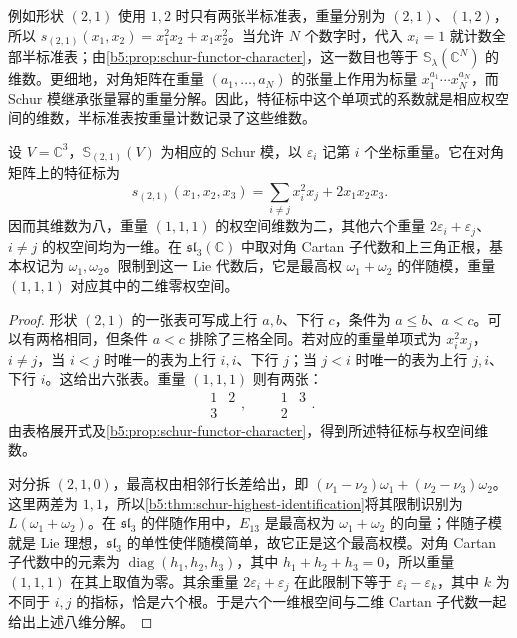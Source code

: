 例如形状 \((2,1)\) 使用 \(1,2\) 时只有两张半标准表，重量分别为 \((2,1)\)、\((1,2)\)，所以 \(s_{(2,1)}(x_1,x_2)=x_1^2x_2+x_1x_2^2\)。当允许 \(N\) 个数字时，代入 \(x_i=1\) 就计数全部半标准表；由\cref{b5:prop:schur-functor-character}，这一数目也等于 \(\mathbb S_\lambda(\mathbb C^N)\) 的维数。更细地，对角矩阵在重量 \((a_1,\ldots,a_N)\) 的张量上作用为标量 \(x_1^{a_1}\cdots x_N^{a_N}\)，而 Schur 模继承张量幂的重量分解。因此，特征标中这个单项式的系数就是相应权空间的维数，半标准表按重量计数记录了这些维数。

\begin{proposition}\label{b5:prop:A-schur-21-weights}
	设 \(V=\mathbb C^3\)，\(\mathbb S_{(2,1)}(V)\) 为相应的 Schur 模，以 \(\varepsilon_i\) 记第 \(i\) 个坐标重量。它在对角矩阵上的特征标为
	\[
		s_{(2,1)}(x_1,x_2,x_3) =\sum_{i\ne j}x_i^2x_j+2x_1x_2x_3.
	\]
	因而其维数为八，重量 \((1,1,1)\) 的权空间维数为二，其他六个重量 \(2\varepsilon_i+\varepsilon_j\)、\(i\ne j\) 的权空间均为一维。在 \(\mathfrak{sl}_3(\mathbb C)\) 中取对角 Cartan 子代数和上三角正根，基本权记为 \(\omega_1,\omega_2\)。限制到这一 Lie 代数后，它是最高权 \(\omega_1+\omega_2\) 的伴随模，重量 \((1,1,1)\) 对应其中的二维零权空间。
\end{proposition}
\begin{proof}
	形状 \((2,1)\) 的一张表可写成上行 \(a,b\)、下行 \(c\)，条件为 \(a\le b\)、\(a<c\)。可以有两格相同，但条件 \(a<c\) 排除了三格全同。若对应的重量单项式为 \(x_i^2x_j\)，\(i\ne j\)，当 \(i<j\) 时唯一的表为上行 \(i,i\)、下行 \(j\)；当 \(j<i\) 时唯一的表为上行 \(j,i\)、下行 \(i\)。这给出六张表。重量 \((1,1,1)\) 则有两张：
	\[
		\begin{array}{cc}1&2\\3&\end{array},
		\qquad
		\begin{array}{cc}1&3\\2&\end{array}.
	\]
	由表格展开式及\cref{b5:prop:schur-functor-character}，得到所述特征标与权空间维数。

	对分拆 \((2,1,0)\)，最高权由相邻行长差给出，即 \((\nu_1-\nu_2)\omega_1+(\nu_2-\nu_3)\omega_2\)。这里两差为 \(1,1\)，所以\cref{b5:thm:schur-highest-identification}将其限制识别为 \(L(\omega_1+\omega_2)\)。在 \(\mathfrak{sl}_3\) 的伴随作用中，\(E_{13}\) 是最高权为 \(\omega_1+\omega_2\) 的向量；伴随子模就是 Lie 理想，\(\mathfrak{sl}_3\) 的单性使伴随模简单，故它正是这个最高权模。对角 Cartan 子代数中的元素为 \(\operatorname{diag}(h_1,h_2,h_3)\)，其中 \(h_1+h_2+h_3=0\)，所以重量 \((1,1,1)\) 在其上取值为零。其余重量 \(2\varepsilon_i+\varepsilon_j\) 在此限制下等于 \(\varepsilon_i-\varepsilon_k\)，其中 \(k\) 为不同于 \(i,j\) 的指标，恰是六个根。于是六个一维根空间与二维 Cartan 子代数一起给出上述八维分解。
\end{proof}

